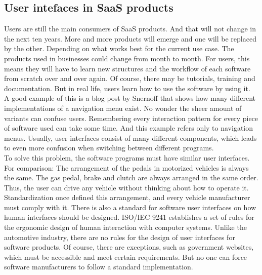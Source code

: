 \subsection{User intefaces in SaaS products}
Users are still the main consumers of SaaS products. And that will not change in the next ten years. More and more products will emerge and one will be replaced by the other. Depending on what works best for the current use case. The products used in businesses could change from month to month. For users, this means they will have to learn new structures and the workflow of each software from scratch over and over again. Of course, there may be tutorials, training and documentation. But in real life, users learn how to use the software by using it. \\
A good example of this is a blog post by Snernoff \citeauthor{sernoff_website_2021} that shows how many different implementations of a navigation menu exist. No wonder the sheer amount of variants can confuse users. Remembering every interaction pattern for every piece of software used can take some time. And this example refers only to navigation menus. Usually, user interfaces consist of many different components, which leads to even more confusion when switching between different programs. \\
To solve this problem, the software programs must have similar user interfaces. For comparison: The arrangement of the pedals in motorized vehicles is always the same. The gas pedal, brake and clutch are always arranged in the same order. Thus, the user can drive any vehicle without thinking about how to operate it. Standardization once defined this arrangement, and every vehicle manufacturer must comply with it. There is also a standard for software user interfaces on how human interfaces should be designed. ISO/IEC 9241 establishes a set of rules for the ergonomic design of human interaction with computer systems. Unlike the automotive industry, there are no rules for the design of user interfaces for software products. Of course, there are exceptions, such as government websites, which must be accessible and meet certain requirements. But no one can force software manufacturers to follow a standard implementation. \\

